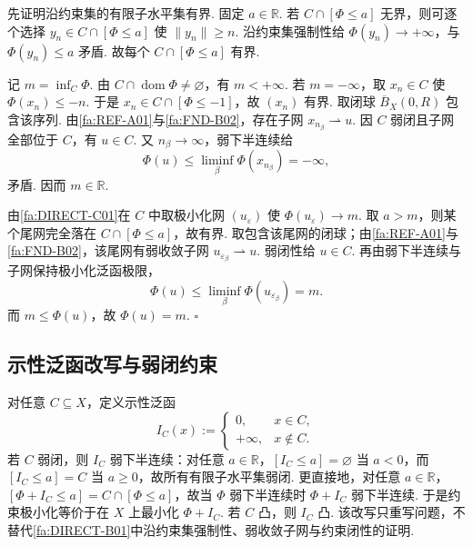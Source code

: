 \begin{FAProof}
先证明沿约束集的有限子水平集有界. 固定 \(\displaystyle a\in\mathbb R\). 若 \(\displaystyle C\cap[\Phi\leqslant a]\) 无界，则可逐个选择 \(\displaystyle y_n\in C\cap[\Phi\leqslant a]\) 使 \(\displaystyle\|y_n\|\geqslant n\). 沿约束集强制性给 \(\displaystyle\Phi(y_n)\to+\infty\)，与 \(\displaystyle\Phi(y_n)\leqslant a\) 矛盾. 故每个 \(\displaystyle C\cap[\Phi\leqslant a]\) 有界.

记 \(\displaystyle m=\inf_C\Phi\). 由 \(\displaystyle C\cap\operatorname{dom}\Phi\neq\varnothing\)，有 \(\displaystyle m<+\infty\). 若 \(\displaystyle m=-\infty\)，取 \(\displaystyle x_n\in C\) 使 \(\displaystyle\Phi(x_n)\leqslant-n\). 于是 \(\displaystyle x_n\in C\cap[\Phi\leqslant-1]\)，故 \(\displaystyle(x_n)\) 有界. 取闭球 \(\displaystyle\overline B_X(0,R)\) 包含该序列. 由\autoref{fa:REF-A01}与\autoref{fa:FND-B02}，存在子网 \(\displaystyle x_{n_\beta}\rightharpoonup u\). 因 \(\displaystyle C\) 弱闭且子网全部位于 \(\displaystyle C\)，有 \(\displaystyle u\in C\). 又 \(\displaystyle n_\beta\to\infty\)，弱下半连续给
\[
\Phi(u)
\leqslant
\liminf_\beta\Phi(x_{n_\beta})
=
-\infty,
\]
矛盾. 因而 \(\displaystyle m\in\mathbb R\).

由\autoref{fa:DIRECT-C01}在 \(\displaystyle C\) 中取极小化网 \(\displaystyle(u_\varepsilon)\) 使 \(\displaystyle\Phi(u_\varepsilon)\to m\). 取 \(\displaystyle a>m\)，则某个尾网完全落在 \(\displaystyle C\cap[\Phi\leqslant a]\)，故有界. 取包含该尾网的闭球；由\autoref{fa:REF-A01}与\autoref{fa:FND-B02}，该尾网有弱收敛子网 \(\displaystyle u_{\varepsilon_\beta}\rightharpoonup u\). 弱闭性给 \(\displaystyle u\in C\). 再由弱下半连续与子网保持极小化泛函极限，
\[
\Phi(u)
\leqslant
\liminf_\beta\Phi(u_{\varepsilon_\beta})
=
m.
\]
而 \(\displaystyle m\leqslant\Phi(u)\)，故 \(\displaystyle\Phi(u)=m\).
\hfill\(\square\)
\end{FAProof}

\subsection{示性泛函改写与弱闭约束}

对任意 \(\displaystyle C\subseteq X\)，定义示性泛函
\[
I_C(x)
:=
\begin{cases}
0,&x\in C,\\
+\infty,&x\notin C.
\end{cases}
\]
若 \(\displaystyle C\) 弱闭，则 \(\displaystyle I_C\) 弱下半连续：对任意 \(\displaystyle a\in\mathbb R\)，\(\displaystyle[I_C\leqslant a]=\varnothing\) 当 \(\displaystyle a<0\)，而 \(\displaystyle[I_C\leqslant a]=C\) 当 \(\displaystyle a\geqslant0\)，故所有有限子水平集弱闭. 更直接地，对任意 \(\displaystyle a\in\mathbb R\)，\(\displaystyle[\Phi+I_C\leqslant a]=C\cap[\Phi\leqslant a]\)，故当 \(\displaystyle\Phi\) 弱下半连续时 \(\displaystyle\Phi+I_C\) 弱下半连续. 于是约束极小化等价于在 \(\displaystyle X\) 上最小化 \(\displaystyle\Phi+I_C\). 若 \(\displaystyle C\) 凸，则 \(\displaystyle I_C\) 凸. 该改写只重写问题，不替代\autoref{fa:DIRECT-B01}中沿约束集强制性、弱收敛子网与约束闭性的证明.

